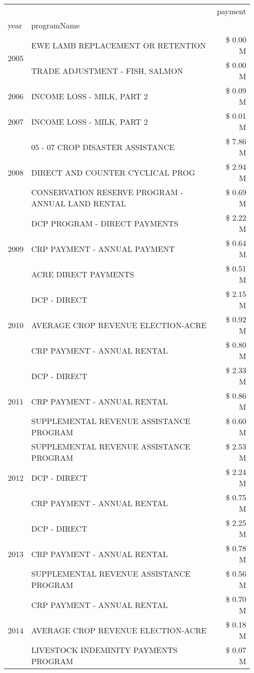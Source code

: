 \begin{tabular}{llr}
\toprule
 &  & payment \\
year & programName &  \\
\midrule
\multirow[t]{2}{*}{2005} & EWE LAMB REPLACEMENT OR RETENTION & \$ 0.00 M \\
 & TRADE ADJUSTMENT - FISH, SALMON & \$ 0.00 M \\
\cline{1-3}
2006 & INCOME LOSS - MILK, PART 2 & \$ 0.09 M \\
\cline{1-3}
2007 & INCOME LOSS - MILK, PART 2 & \$ 0.01 M \\
\cline{1-3}
\multirow[t]{3}{*}{2008} & 05 - 07 CROP DISASTER ASSISTANCE & \$ 7.86 M \\
 & DIRECT AND COUNTER CYCLICAL PROG & \$ 2.94 M \\
 & CONSERVATION RESERVE PROGRAM - ANNUAL LAND RENTAL & \$ 0.69 M \\
\cline{1-3}
\multirow[t]{3}{*}{2009} & DCP PROGRAM - DIRECT PAYMENTS & \$ 2.22 M \\
 & CRP PAYMENT - ANNUAL PAYMENT & \$ 0.64 M \\
 & ACRE DIRECT PAYMENTS & \$ 0.51 M \\
\cline{1-3}
\multirow[t]{3}{*}{2010} & DCP - DIRECT & \$ 2.15 M \\
 & AVERAGE CROP REVENUE ELECTION-ACRE & \$ 0.92 M \\
 & CRP PAYMENT - ANNUAL RENTAL & \$ 0.80 M \\
\cline{1-3}
\multirow[t]{3}{*}{2011} & DCP - DIRECT & \$ 2.33 M \\
 & CRP PAYMENT - ANNUAL RENTAL & \$ 0.86 M \\
 & SUPPLEMENTAL REVENUE ASSISTANCE PROGRAM & \$ 0.60 M \\
\cline{1-3}
\multirow[t]{3}{*}{2012} & SUPPLEMENTAL REVENUE ASSISTANCE PROGRAM & \$ 2.53 M \\
 & DCP - DIRECT & \$ 2.24 M \\
 & CRP PAYMENT - ANNUAL RENTAL & \$ 0.75 M \\
\cline{1-3}
\multirow[t]{3}{*}{2013} & DCP - DIRECT & \$ 2.25 M \\
 & CRP PAYMENT - ANNUAL RENTAL & \$ 0.78 M \\
 & SUPPLEMENTAL REVENUE ASSISTANCE PROGRAM & \$ 0.56 M \\
\cline{1-3}
\multirow[t]{3}{*}{2014} & CRP PAYMENT - ANNUAL RENTAL & \$ 0.70 M \\
 & AVERAGE CROP REVENUE ELECTION-ACRE & \$ 0.18 M \\
 & LIVESTOCK INDEMINITY PAYMENTS PROGRAM & \$ 0.07 M \\

\end{tabular}
